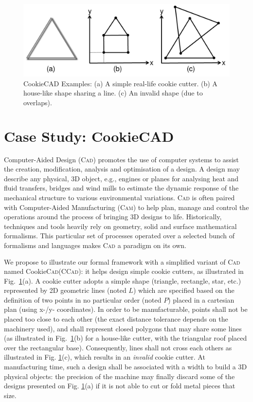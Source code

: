 \begin{figure}[t]
   \centering
   \includegraphics[width=\columnwidth]{CookieCAD.pdf}
   \caption{CookieCAD Examples: (a) A simple real-life cookie cutter. (b) A 
house-like shape sharing a line. (c) An invalid shape (due to overlaps).}%
   \label{fig:CookieCAD}
\end{figure}

\section{Case Study: CookieCAD}
\label{sec:CS}

Computer-Aided Design (\textsc{Cad}) \cite{B:Groover-Zimmers:2008} promotes the
use of computer systems to assist the creation, modification, analysis and
optimisation of a design.
A design may describe any physical, 3D object, e.g., engines or planes for
analysing heat and fluid transfers, bridges and wind mills to estimate the
dynamic response of the mechanical structure to various environmental
variations. \textsc{Cad} is often paired with Computer-Aided Manufacturing
(\textsc{Cam}) to help plan, manage and control the operations around the
process of bringing 3D designs to life. Historically, techniques and tools
heavily rely on geometry, solid and surface mathematical formalisms. This
particular set of processes operated over a selected bunch of formalisms and
languages makes \textsc{Cad} a paradigm on its own.

We propose to illustrate our formal framework with a simplified variant of 
\textsc{Cad} named Cookie\textsc{Cad}(\textsc{CCad}): it helps design simple 
cookie cutters, as illustrated in Fig.~\ref{fig:CookieCAD}(a). A cookie cutter 
adopts a simple shape (triangle, rectangle, star, etc.) represented by 2D geometric 
lines (noted $L$) which are specified based on the definition of two points in 
no particular order (noted $P$) placed in a cartesian plan (using x-/y- 
coordinates). In order to be manufacturable, points shall not be placed too 
close to each other (the exact distance tolerance depends on the machinery 
used), and shall represent closed polygons that may share some lines (as 
illustrated in Fig.~\ref{fig:CookieCAD}(b) for a house-like cutter, with the 
triangular roof placed over the rectangular base). Consequently, lines shall not 
cross each others as illustrated in Fig. \ref{fig:CookieCAD}(c), which results 
in an \emph{invalid} cookie cutter. At manufacturing time, such a design shall 
be associated with a width to build a 3D physical objects: the precision of the 
machine may finally discard some of the designs presented on Fig. 
\ref{fig:CookieCAD}(a) if it is not able to cut or fold metal pieces that size.

